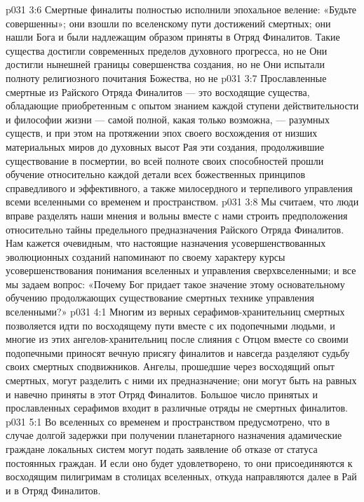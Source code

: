 \vs p031 3:6 \pc {}\bibnobreakspace Смертные финалиты полностью исполнили эпохальное веление: «Будьте совершенны»; они взошли по вселенскому пути достижений смертных; они нашли Бога и были надлежащим образом приняты в Отряд Финалитов. Такие существа достигли современных пределов духовного прогресса, но не  Они достигли нынешней границы совершенства создания, но не  Они испытали полноту религиозного почитания Божества, но не 
\vs p031 3:7 \pc {}\bibnobreakspace Прославленные смертные из Райского Отряда Финалитов --- это восходящие существа, обладающие приобретенным с опытом знанием каждой ступени действительности и философии жизни --- самой полной, какая только возможна, --- разумных существ, и при этом на протяжении эпох своего восхождения от низших материальных миров до духовных высот Рая эти создания, продолжившие существование в посмертии, во всей полноте своих способностей прошли обучение относительно каждой детали всех божественных принципов справедливого и эффективного, а также милосердного и терпеливого управления всеми вселенными со временем и пространством.
\vs p031 3:8 \pc Мы считаем, что люди вправе разделять наши мнения и вольны вместе с нами строить предположения относительно тайны предельного предназначения Райского Отряда Финалитов. Нам кажется очевидным, что настоящие назначения усовершенствованных эволюционных созданий напоминают по своему характеру курсы усовершенствования понимания вселенных и управления сверхвселенными; и все мы задаем вопрос: «Почему Бог придает такое значение этому основательному обучению продолжающих существование смертных технике управления вселенными?»
\vs p031 4:1 Многим из верных серафимов\hyp{}хранительниц смертных позволяется идти по восходящему пути вместе с их подопечными людьми, и многие из этих ангелов\hyp{}хранительниц после слияния с Отцом вместе со своими подопечными приносят вечную присягу финалитов и навсегда разделяют судьбу своих смертных сподвижников. Ангелы, прошедшие через восходящий опыт смертных, могут разделить с ними их предназначение; они могут быть на равных и навечно приняты в этот Отряд Финалитов. Большое число принятых и прославленных серафимов входит в различные отряды не смертных финалитов.
\vs p031 5:1 Во вселенных со временем и пространством предусмотрено, что в случае долгой задержки при получении планетарного назначения адамические граждане локальных систем могут подать заявление об отказе от статуса постоянных граждан. И если оно будет удовлетворено, то они присоединяются к восходящим пилигримам в столицах вселенных, откуда направляются далее в Рай и в Отряд Финалитов.
